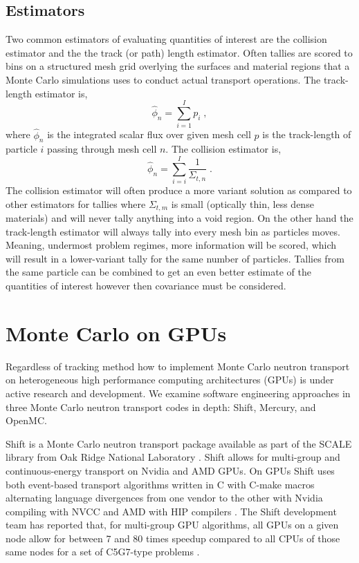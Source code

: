\subsection{Estimators}
\label{c5:estimators}

Two common estimators of evaluating quantities of interest are the collision estimator and the the track (or path) length estimator.
Often tallies are scored to bins on a structured mesh grid overlying the surfaces and material regions that a Monte Carlo simulations uses to conduct actual transport operations.
The track-length estimator is,
\begin{equation}
    \hat{\phi}_n = \sum_{i=1}^{I}p_i \; ,
\end{equation}
where $\hat{\phi}_n$ is the integrated scalar flux over given mesh cell $p$ is the track-length of particle $i$ passing through mesh cell $n$.
The collision estimator is,
\begin{equation}
    \hat{\phi}_n = \sum_{i=i}^{I} \frac{1}{\Sigma_{t,n}} \;.
\end{equation}
The collision estimator will often produce a more variant solution as compared to other estimators for tallies where $\Sigma_{t,m}$ is small (optically thin, less dense materials) and will never tally anything into a void region.
On the other hand the track-length estimator will always tally into every mesh bin as particles moves.
Meaning, undermost problem regimes, more information will be scored, which will result in a lower-variant tally for the same number of particles.
Tallies from the same particle can be combined to get an even better estimate of the quantities of interest however then covariance must be considered.


\section{Monte Carlo on GPUs}

Regardless of tracking method how to implement Monte Carlo neutron transport on heterogeneous high performance computing architectures (GPUs) is under active research and development.
We examine software engineering approaches in three Monte Carlo neutron transport codes in depth: Shift, Mercury, and OpenMC.

Shift is a Monte Carlo neutron transport package available as part of the SCALE library from Oak Ridge National Laboratory \cite{pandya_implementation_2016}.
Shift allows for multi-group and continuous-energy transport on Nvidia and AMD GPUs.
On GPUs Shift uses both event-based transport algorithms written in C with C-make macros alternating language divergences from one vendor to the other with Nvidia compiling with NVCC and AMD with HIP compilers \cite{mcsummit}.
The Shift development team has reported that, for multi-group GPU algorithms, all GPUs on a given node allow for between 7 and 80 times speedup compared to all CPUs of those same nodes for a set of C5G7-type problems \cite{hamilton_multigroup_2018}.


